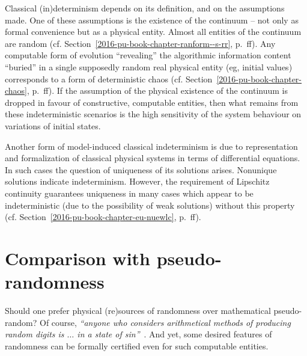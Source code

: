 Classical (in)determinism depends on its definition, and on the assumptions made.
One of these assumptions is the existence of the continuum -- not only as formal convenience but as a physical entity.
Almost all entities of the continuum are random
(cf. Section~\ref{2016-pu-book-chapter-ranform--s-rr}, p.~\pageref{2016-pu-book-chapter-ranform--s-rr}ff).
Any computable form of evolution ``revealing'' the algorithmic information content ``buried'' in a single
supposedly  random real physical entity (eg, initial values)
corresponds to a form of deterministic  chaos (cf. Section~\ref{2016-pu-book-chapter-chaos}, p.~\pageref{2016-pu-book-chapter-chaos}ff).
If the assumption of the physical existence of the continuum is dropped in favour of constructive, computable entities,
then what remains from these indeterministic scenarios is the high sensitivity of the system behaviour on variations of initial states.


Another form of model-induced classical indeterminism is due to representation and formalization of
classical physical systems in terms of differential equations.
In such cases the question of uniqueness of its solutions arises.
Nonunique solutions indicate indeterminism.
However, the requirement of
Lipschitz continuity
guarantees uniqueness in many cases which appear to
be indeterministic (due to the possibility of weak solutions) without this property
(cf. Section~\ref{2016-pu-book-chapter-eu-nuewlc}, p.~\pageref{2016-pu-book-chapter-eu-nuewlc}ff).


\section{Comparison with pseudo-randomness}


Should one prefer physical (re)sources of randomness over mathematical pseudo-random?  Of course,
{\em ``anyone who considers arithmetical methods of producing random digits is $\ldots$ in a state of sin''}~\cite[p.~768]{von-neumann1}.
And yet, some desired features of randomness can be formally certified even for such computable entities.

